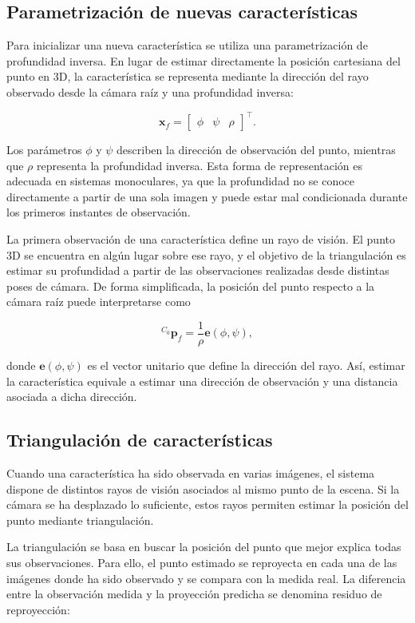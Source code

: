 \subsection{Parametrización de nuevas características}

Para inicializar una nueva característica se utiliza una parametrización de profundidad
inversa. En lugar de estimar directamente la posición cartesiana del punto en 3D, la
característica se representa mediante la dirección del rayo observado desde la cámara raíz
y una profundidad inversa:

\[
\mathbf{x}_f =
\begin{bmatrix}
\phi & \psi & \rho
\end{bmatrix}^\top.
\]

Los parámetros $\phi$ y $\psi$ describen la dirección de observación del punto, mientras
que $\rho$ representa la profundidad inversa. Esta forma de representación es adecuada en
sistemas monoculares, ya que la profundidad no se conoce directamente a partir de una sola
imagen y puede estar mal condicionada durante los primeros instantes de observación.

La primera observación de una característica define un rayo de visión. El punto 3D se
encuentra en algún lugar sobre ese rayo, y el objetivo de la triangulación es estimar su
profundidad a partir de las observaciones realizadas desde distintas poses de cámara. De
forma simplificada, la posición del punto respecto a la cámara raíz puede interpretarse
como

\[
{}^{C_0}\mathbf{p}_f =
\frac{1}{\rho}\mathbf{e}(\phi,\psi),
\]

donde $\mathbf{e}(\phi,\psi)$ es el vector unitario que define la dirección del rayo. Así,
estimar la característica equivale a estimar una dirección de observación y una distancia
asociada a dicha dirección.

\subsection{Triangulación de características}

Cuando una característica ha sido observada en varias imágenes, el sistema dispone de
distintos rayos de visión asociados al mismo punto de la escena. Si la cámara se ha
desplazado lo suficiente, estos rayos permiten estimar la posición del punto mediante
triangulación.

La triangulación se basa en buscar la posición del punto que mejor explica todas sus
observaciones. Para ello, el punto estimado se reproyecta en cada una de las imágenes donde
ha sido observado y se compara con la medida real. La diferencia entre la observación
medida y la proyección predicha se denomina residuo de reproyección:

